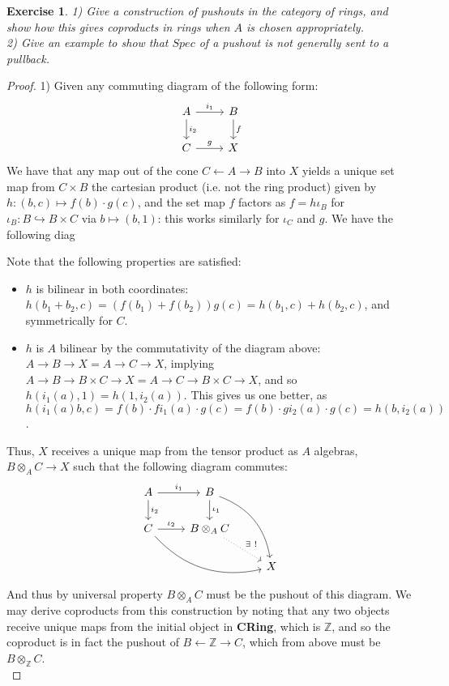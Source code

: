 \documentclass{article}
\newcommand{\bb}[1]{\mathbb{#1}}
\newtheorem{exercise}{Exercise}
\begin{document}
\begin{exercise}
1) Give a construction of pushouts in the category of rings, and show how this gives coproducts in rings when $A$ is chosen appropriately. \\  
2) Give an example to show that $Spec$ of a pushout is not generally sent to a pullback.
\end{exercise}
\begin{proof}
  1) Given any commuting diagram of the following form:
  \[
    \begin{tikzcd}
      A \arrow[r, "i_{1}"] \arrow[d, "i_{2}"] & B \arrow[d, "f"] \\
      C \arrow[r, "g"] & X
    \end{tikzcd}
  \]
We have that any map out of the cone $C \leftarrow A \rightarrow B$ into $X$ yields a unique set map from $C \times B$ the cartesian product (i.e. not the ring product) given by $h: (b,c) \mapsto f(b) \cdot g(c)$, and the set map $f$ factors as $f = h \iota_{B}$ for $\iota_{B} : B \hookrightarrow B \times C$ via $b \mapsto (b,1)$: this works similarly for $\iota_{C}$ and $g$. We have the following diag

  Note that the following properties are satisfied:
  \begin{itemize}
  \item $h$ is bilinear in both coordinates: $h(b_{1}+b_{2},c) = (f(b_{1})+f(b_{2})) g(c) = h(b_{1},c) + h(b_{2},c)$, and symmetrically for $C$.
  \item $h$ is $A$ bilinear by the commutativity of the diagram above: $A \to B \to X = A \to C \to X$, implying $A \to B \to B \times C \to X = A \to C \to B \times C \to X$, and so $h(i_{1}(a), 1) = h(1, i_{2}(a))$. This gives us one better, as $h(i_{1}(a)b, c) = f(b) \cdot fi_{1}(a) \cdot g(c) = f(b) \cdot gi_{2}(a) \cdot g(c) = h(b, i_{2}(a))$. 
  \end{itemize}
  Thus, $X$ receives a unique map from the tensor product as $A$ algebras, $B \otimes_{A} C \to X$ such that the following diagram commutes:
  \[
    \begin{tikzcd}
A \arrow[r, "i_{1}"] \arrow[d, "i_2"]          & B \arrow[d, "\iota_1"] \arrow[rdd, bend left] &   \\
C \arrow[r, "\iota_2"] \arrow[rrd, bend right] & B \otimes_A C \arrow[rd, dotted, "\exists \ !"]              &   \\
                                               &                                               & X
\end{tikzcd}
\]
And thus by universal property $B \otimes_{A} C$ must be the pushout of this diagram. We may derive coproducts from this construction by noting that any two objects receive unique maps from the initial object in \textbf{CRing}, which is $\bb{Z}$, and so the coproduct is in fact the pushout of $B \leftarrow \bb{Z} \rightarrow C$, which from above must be $B \otimes_{\bb{Z}}C$.  \\


\end{proof}
\end{document}
